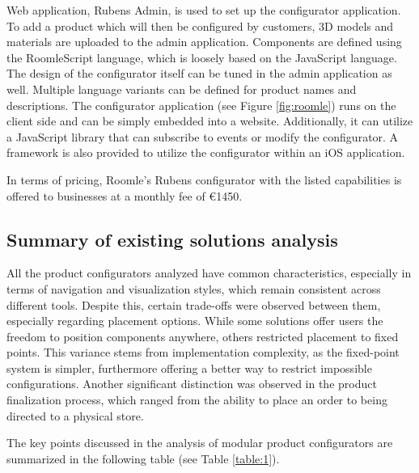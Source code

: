 Web application, Rubens Admin, is used to set up the configurator application. To add a product which will then be configured by customers, 3D models and materials are uploaded to the admin application. Components are defined using the RoomleScript language, which is loosely based on the JavaScript language. The design of the configurator itself can be tuned in the admin application as well. Multiple language variants can be defined for product names and descriptions. The configurator application (see Figure \ref{fig:roomle}) runs on the client side and can be simply embedded into a website. Additionally, it can utilize a JavaScript library that can subscribe to events or modify the configurator. A framework is also provided to utilize the configurator within an iOS application. \cite{RoomleDocumentation}

In terms of pricing, Roomle's Rubens configurator with the listed capabilities is offered to businesses at a monthly fee of €1450. \cite{RoomleFullLogic}

\subsection{Summary of existing solutions analysis}

All the product configurators analyzed have common characteristics, especially in terms of navigation and visualization styles, which remain consistent across different tools. Despite this, certain trade-offs were observed between them, especially regarding placement options. While some solutions offer users the freedom to position components anywhere, others restricted placement to fixed points. This variance stems from implementation complexity, as the fixed-point system is simpler, furthermore offering a better way to restrict impossible configurations.
Another significant distinction was observed in the product finalization process, which ranged from the ability to place an order to being directed to a physical store.

The key points discussed in the analysis of modular product configurators are summarized in the following table (see Table \ref{table:1}).

